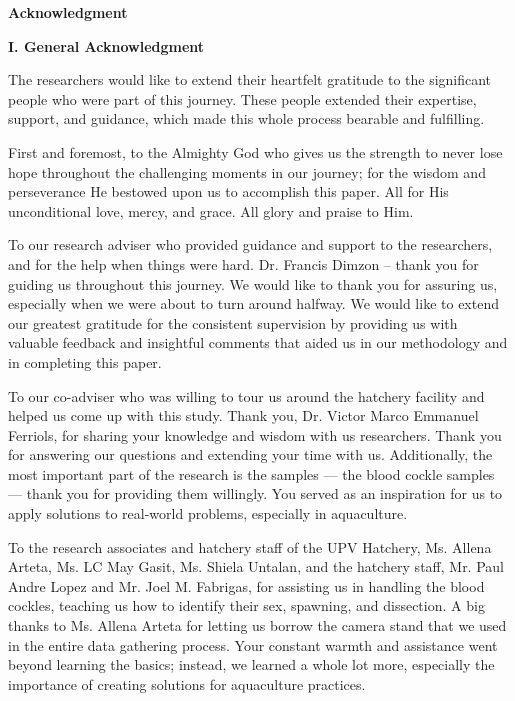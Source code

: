 \begin{center}
	\textbf{Acknowledgment}
\end{center}

\noindent\textbf{I. General Acknowledgment} \\
\vspace{-0.5cm}

The researchers would like to extend their heartfelt gratitude to the significant people who were part of this journey. These people extended their expertise, support, and guidance, which made this whole process bearable and fulfilling.

First and foremost, to the Almighty God who gives us the strength to never lose hope throughout the challenging moments in our journey; for the wisdom and perseverance He bestowed upon us to accomplish this paper. All for His unconditional love, mercy, and grace. All glory and praise to Him.

To our research adviser who provided guidance and support to the researchers, and for the help when things were hard. Dr. Francis Dimzon – thank you for guiding us throughout this journey. We would like to thank you for assuring us, especially when we were about to turn around halfway. We would like to extend our greatest gratitude for the consistent supervision by providing us with valuable feedback and insightful comments that aided us in our methodology and in completing this paper.

To our co-adviser who was willing to tour us around the hatchery facility and helped us come up with this study. Thank you, Dr. Victor Marco Emmanuel Ferriols, for sharing your knowledge and wisdom with us researchers. Thank you for answering our questions and extending your time with us. Additionally, the most important part of the research is the samples — the blood cockle samples — thank you for providing them willingly. You served as an inspiration for us to apply solutions to real-world problems, especially in aquaculture.

To the research associates and hatchery staff of the UPV Hatchery, Ms. Allena Arteta, Ms. LC May Gasit, Ms. Shiela Untalan, and the hatchery staff, Mr. Paul Andre Lopez and Mr. Joel M. Fabrigas, for assisting us in handling the blood cockles, teaching us how to identify their sex, spawning, and dissection. A big thanks to Ms. Allena Arteta for letting us borrow the camera stand that we used in the entire data gathering process. Your constant warmth and assistance went beyond learning the basics; instead, we learned a whole lot more, especially the importance of creating solutions for aquaculture practices.

